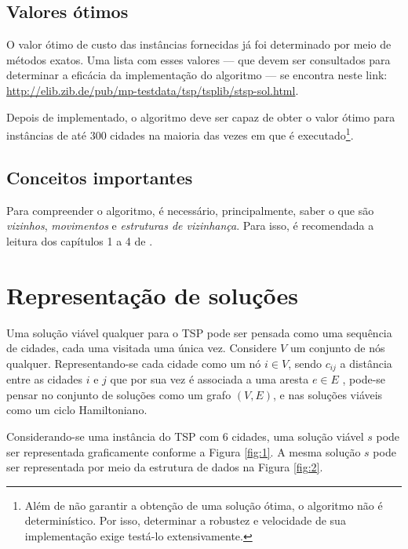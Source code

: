 \subsection{Valores ótimos}
O valor ótimo de custo das instâncias fornecidas já foi determinado por meio de métodos exatos. Uma lista com esses valores --- que devem ser consultados para determinar a eficácia da implementação do algoritmo --- se encontra neste link: \url{http://elib.zib.de/pub/mp-testdata/tsp/tsplib/stsp-sol.html}.

Depois de implementado, o algoritmo deve ser capaz de obter o valor ótimo para instâncias de até 300 cidades na maioria das vezes em que é executado\footnote{Além de não garantir a obtenção de uma solução ótima, o algoritmo não é determinístico. Por isso, determinar a robustez e velocidade de sua implementação exige testá-lo extensivamente.}.

\subsection{Conceitos importantes}
Para compreender o algoritmo, é necessário, principalmente, saber o que são \textit{vizinhos}, \textit{movimentos} e \textit{estruturas de vizinhança}. Para isso, é recomendada a leitura dos capítulos 1 a 4 de \cite{MARCONE2011}.

\section{Representação de soluções}
Uma solução viável qualquer para o TSP pode ser pensada como uma sequência de cidades, cada uma visitada uma única vez. Considere \(V\) um conjunto de nós qualquer. Representando-se cada cidade como um nó \(i \in V\), sendo \(c_{ij}\) a distância entre as cidades \(i\) e \(j\) que por sua vez é associada a uma aresta \(e \in E\) , pode-se pensar no conjunto de soluções como um grafo \((V, E)\), e nas soluções viáveis como um ciclo Hamiltoniano.  

Considerando-se uma instância do TSP com 6 cidades, uma \linebreak solução viável \(s\) pode ser representada graficamente conforme a Figura \ref{fig:1}. A mesma solução \(s\) pode ser representada por meio da estrutura de dados na Figura \ref{fig:2}.



